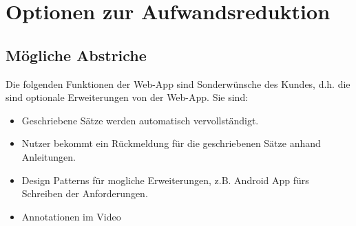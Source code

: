 \section{Optionen zur Aufwandsreduktion}

	\subsection{Mögliche Abstriche}
	Die folgenden Funktionen der Web-App sind Sonderwünsche des Kundes, d.h. die sind optionale Erweiterungen von der Web-App. Sie sind:
	\begin{itemize}
		\item Geschriebene Sätze werden automatisch vervollständigt.
		\item Nutzer bekommt ein Rückmeldung für die geschriebenen Sätze anhand Anleitungen.
		\item Design Patterns für mogliche Erweiterungen, z.B. Android App fürs Schreiben der Anforderungen.
		\item Annotationen im Video
	\end{itemize}
	
